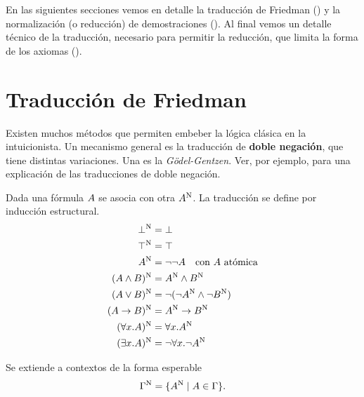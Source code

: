 En las siguientes secciones vemos en detalle la traducción de Friedman
() y la normalización (o reducción) de demostraciones (). Al final vemos un detalle técnico de la traducción, necesario para permitir la reducción, que limita la forma de los axiomas ().

\section{Traducción de Friedman}
\label{fri:sec:fri}

Existen muchos métodos que permiten embeber la lógica clásica en la
intuicionista. Un mecanismo general es la traducción de
\textbf{doble negación}, que tiene distintas variaciones. Una es la
\textit{Gödel-Gentzen}. Ver, por ejemplo, \cite{Avigad1998-FEFOFD} para una explicación de las traducciones de doble negación.

\begin{definition} Dada una fórmula $A$
    se asocia con otra $A^{\text{N}}$. La traducción se define por inducción
    estructural.
    \begin{align*}
        \bot^{\text{N}}                      & = \bot                                           \\
        \top^{\text{N}}                       & = \top                                            \\
        A^{\text{N}}                        & = \neg\neg A \quad \text{con $A$ atómica} \\
        (A \wedge B)^{\text{N}}       & = A^{\text{N}} \wedge B^{\text{N}}                    \\
        (A \vee B)^{\text{N}}        & = \neg(\neg A^{\text{N}} \wedge \neg B^{\text{N}})   \\
        (A \to B)^{\text{N}}       & = A^{\text{N}} \to B^{\text{N}}                    \\
        (\forall x . A)^{\text{N}} & = \forall x . A^{\text{N}}                   \\
        (\exists x . A)^{\text{N}} & = \neg \forall x . \neg A^{\text{N}}
    \end{align*}
\end{definition}


\begin{definition}
    Se extiende a contextos de la forma esperable
    \[
        \Gamma^{\text{N}} = \{A^{\text{N}} \mid A \in \Gamma \}.
    \]
\end{definition}

